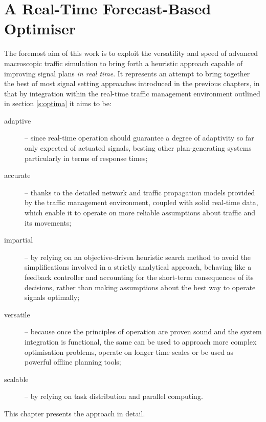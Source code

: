 \chapter{A Real-Time Forecast-Based Optimiser} \label{c:optimiser}

The foremost aim of this work is to exploit the versatility and speed of advanced macroscopic traffic simulation to bring forth a heuristic approach capable of improving signal plans \emph{in real time}.
It represents an attempt to bring together the best of most signal setting approaches introduced in the previous chapters, in that by integration within the real-time traffic management environment outlined in section \ref{s:optima} it aims to be:
\begin{description}
\item[adaptive] \--- since real-time operation should guarantee a degree of adaptivity so far only expected of actuated signals, besting other plan-generating systems particularly in terms of response times;

\item[accurate] \--- thanks to the detailed network and traffic propagation models provided by the traffic management environment, coupled with solid real-time data, which enable it to operate on more reliable assumptions about traffic and its movements;

\item[impartial] \--- by relying on an objective-driven heuristic search method to avoid the simplifications involved in a strictly analytical approach, behaving like a feedback controller and accounting for the short-term consequences of its decisions, rather than making assumptions about the best way to operate signals optimally;

\item[versatile] \--- because once the principles of operation are proven sound and the system integration is functional, the same can be used to approach more complex optimisation problems, operate on longer time scales or be used as powerful offline planning tools;

\item[scalable] \--- by relying on task distribution and parallel computing.
\end{description}

This chapter presents the approach in detail.




